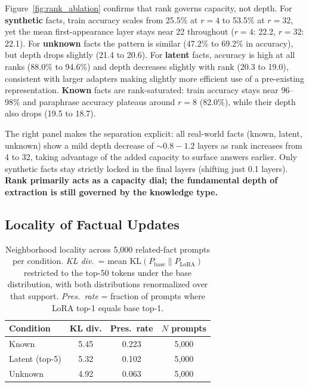 \documentclass[11pt]{article}
\begin{document}
Figure~\ref{fig:rank_ablation} confirms that rank governs capacity, not depth.
For \textbf{synthetic} facts, train accuracy scales from 25.5\% at $r=4$ to
53.5\% at $r=32$, yet the mean first-appearance layer stays near 22 throughout
($r=4$: 22.2, $r=32$: 22.1).
For \textbf{unknown} facts the pattern is similar (47.2\% to 69.2\% in accuracy), but depth drops slightly (21.4 to 20.6).
For \textbf{latent} facts, accuracy is high at all ranks (88.0\% to 94.6\%)
and depth decreases slightly with rank (20.3 to 19.0), consistent with larger
adapters making slightly more efficient use of a pre-existing representation.
\textbf{Known} facts are rank-saturated: train accuracy stays near 96--98\%
and paraphrase accuracy plateaus around $r=8$ (82.0\%), while their depth also drops (19.5 to 18.7).

The right panel makes the separation explicit: all real-world facts (known, latent, unknown) show a mild depth decrease of $\sim 0.8 - 1.2$ layers as rank increases from 4 to 32, taking advantage of the added capacity to surface answers earlier. Only synthetic facts stay strictly locked in the final layers (shifting just 0.1 layers). \textbf{Rank primarily acts as a capacity dial; the fundamental depth of extraction is still governed by the knowledge type.}

\subsection{Locality of Factual Updates}

\begin{table}[t]
\centering\small
\caption{Neighborhood locality across 5{,}000 related-fact prompts per
condition.
\emph{KL div.}\ = mean KL$(P_\text{base} \| P_\text{LoRA})$ restricted to
the top-50 tokens under the base distribution, with both distributions
renormalized over that support.
\emph{Pres.\ rate} = fraction of prompts where LoRA top-1 equals base top-1.}
\label{tab:locality}
\begin{tabular}{lccc}
\toprule
\textbf{Condition} & \textbf{KL div.} & \textbf{Pres.\ rate} & \textbf{$N$ prompts} \\
\midrule
Known          & 5.45 & 0.223 & 5{,}000 \\
Latent (top-5) & 5.32 & 0.102 & 5{,}000 \\
Unknown        & 4.92 & 0.063 & 5{,}000 \\
\bottomrule
\end{tabular}
\end{table}
\end{document}
